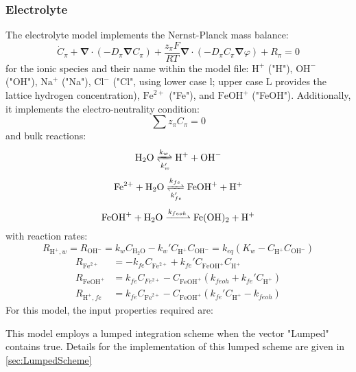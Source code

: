 \documentclass[3p]{elsarticle} %
\begin{document}
\subsubsection{Electrolyte}
The electrolyte model implements the Nernst-Planck mass balance:
\begin{equation}
    \dot{C}_{\pi}+\bm{\nabla}\cdot\left(-D_\pi \bm{\nabla}C_\pi\right) + \frac{z_\pi F}{RT} \bm{\nabla} \cdot \left(-D_\pi C_\pi \bm{\nabla} \varphi\right) +R_\pi = 0 
\end{equation}
for the ionic species and their name within the model file: $\mathrm{H}^+$ ("H"), $\mathrm{OH}^-$ ("OH"), $\mathrm{Na}^+$ ("Na"), $\mathrm{Cl}^-$ ("Cl", using lower case l; upper case L provides the lattice hydrogen concentration), $\mathrm{Fe}^{2+}$ ("Fe"), and $\mathrm{FeOH}^{+}$ ("FeOH"). Additionally, it implements the electro-neutrality condition:
\begin{equation}
	\sum z_\pi C_\pi = 0
\end{equation}
and bulk reactions:
\begin{equation}
    \mathrm{H}_2\mathrm{O} \xrightleftharpoons[k_{w}']{k_{w}} \mathrm{H}^+ + \mathrm{OH}^- \label{react:water}
\end{equation}
\begin{equation}
    \mathrm{Fe}^{2+} + \mathrm{H}_2\mathrm{O} \xrightleftharpoons[k_{fe}']{k_{fe}} \mathrm{FeOH}^+ + \mathrm{H}^+ \label{react:fe_feoh}
\end{equation}
\begin{equation}
    \mathrm{FeOH}^{+} + \mathrm{H}_2\mathrm{O} \xrightharpoonup{k_{feoh}} \mathrm{Fe}(\mathrm{OH})_2 + \mathrm{H}^+ \label{react:feoh_feoh2}
\end{equation}
with reaction rates:
\begin{equation}
    R_{\mathrm{H}^+,w}=R_{\mathrm{OH}^-} = k_{w}C_{\mathrm{H}_2\mathrm{O}} - k_{w}'C_{\mathrm{H}^+}C_{\mathrm{OH}^-}  = k_{eq} \left(K_w-C_{\mathrm{H}^+} C_{\mathrm{OH}^-} \right) \label{eq:water_react}
\end{equation}
\begin{align}
    R_{\mathrm{Fe}^{2+}}&=-k_{fe}C_{\mathrm{Fe}^{2+}}+k_{fe}'C_{\mathrm{FeOH}^+}C_{\mathrm{H}^+} \\
    R_{\mathrm{FeOH}^+}&=k_{fe}C_{Fe^{2+}}-C_{\mathrm{FeOH}^+}(k_{feoh}+k_{fe}'C_{\mathrm{H}^+})\\
    R_{\mathrm{H}^+,fe}&=k_{fe}C_{\mathrm{Fe}^{2+}}-C_{\mathrm{FeOH}^+}(k_{fe}'C_{\mathrm{H}^+}-k_{feoh}) \label{eq:H_Part2}
\end{align}
For this model, the input properties required are:

This model employs a lumped integration scheme when the vector "Lumped" contains true. Details for the implementation of this lumped scheme are given in \cref{sec:LumpedScheme}
\end{document}
